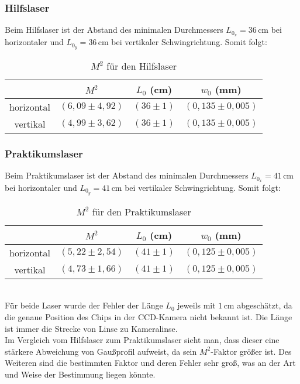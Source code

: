 \subsubsection{Hilfslaser}
Beim Hilfslaser ist der Abstand des minimalen Durchmessers $L_{0_x}=36\,\text{cm}$ bei horizontaler und $L_{0_y}=36\,\text{cm}$ bei vertikaler Schwingrichtung.
Somit folgt:
\begin{table}[h]
    \centering
    \begin{tabular}{c|ccc}
        &$M^2$ & $L_0$ (cm) & $w_0$ (mm) \\\hline
        horizontal &$\left(6,09\pm4,92\right)$&$\left(36\pm1\right)$&$\left(0,135\pm0,005\right)$\\
        vertikal&$\left(4,99\pm3,62\right)$ &$\left(36\pm1\right)$&$\left(0,135\pm0,005\right)$
    \end{tabular}
    \caption{$M^2$ für den Hilfslaser}
\end{table}
\subsubsection{Praktikumslaser}
Beim Praktikumslaser ist der Abstand des minimalen Durchmessers $L_{0_x}=41\,\text{cm}$ bei horizontaler und $L_{0_y}=41\,\text{cm}$ bei vertikaler Schwingrichtung.
Somit folgt:
\begin{table}[h]
    \centering
    \begin{tabular}{c|ccc}
        &$M^2$ & $L_0$ (cm) & $w_0$ (mm) \\\hline
        horizontal &$\left(5,22\pm2,54\right)$&$\left(41\pm1\right)$&$\left(0,125\pm0,005\right)$\\
        vertikal&$\left(4,73\pm1,66\right)$ &$\left(41\pm1\right)$&$\left(0,125\pm0,005\right)$
    \end{tabular}
    \caption{$M^2$ für den Praktikumslaser}
\end{table}\\
Für beide Laser wurde der Fehler der Länge $L_0$ jeweils mit $1\,\text{cm}$ abgeschätzt, da die genaue Position des Chips in der CCD-Kamera nicht bekannt ist.
Die Länge ist immer die Strecke von Linse zu Kameralinse.\\
Im Vergleich vom Hilfslaser zum Praktikumslaser sieht man, dass dieser eine stärkere Abweichung von Gaußprofil aufweist, da sein $M^2$-Faktor größer ist.
Des Weiteren sind die bestimmten Faktor und deren Fehler sehr groß, was an der Art und Weise der Bestimmung liegen könnte.
